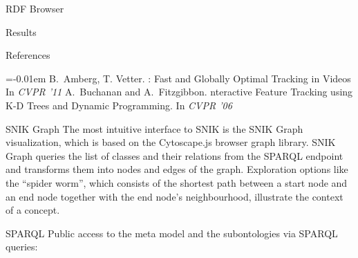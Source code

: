 \documentclass[portrait,final,a0paper,fontscale=0.310]{baposter}
\begin{document}
\begin{poster}
\begin{posterbox}[name=results,below=background]{RDF Browser}
\end{posterbox}
\begin{posterbox}[name=results,below=background]{Results}

\end{posterbox}
\begin{posterbox}[name=references,column=0,below=results]{References}
    \smaller
    
    \renewcommand{\section}[2]{\vskip 0.05em}
      \begin{thebibliography}{1}\itemsep=-0.01em
      \setlength{\baselineskip}{0.4em}
        B.~Amberg, T. Vetter.
        : {F}ast and {G}lobally {O}ptimal {T}racking in {V}ideos
        \newblock In {\em CVPR '11}
        A.~Buchanan and A.~Fitzgibbon.
        nteractive {F}eature {T}racking using {K-D} {T}rees and {D}ynamic {P}rogramming.
        \newblock In {\em CVPR '06}
      \end{thebibliography}
   \vspace{0.3em}
  \end{posterbox}
\begin{posterbox}[name=snikgraph,column=1,row=0]{SNIK Graph}
\indent
The most intuitive interface to SNIK is the SNIK Graph visualization, which is based on the Cytoscape.js browser graph library.
SNIK Graph queries the list of classes and their relations from the SPARQL endpoint and transforms them into nodes and edges of the graph.
Exploration options like the “spider worm”, which consists of the shortest path between a start node and an end node together with the end node’s neighbourhood, illustrate the context of a concept.
\vspace{0.3em}
  \end{posterbox}
\begin{posterbox}[name=sparql,column=1,above=bottom]{SPARQL}
\noindent
Public access to the meta model and the subontologies via SPARQL queries:


\end{posterbox}
\end{poster}
\end{document}
